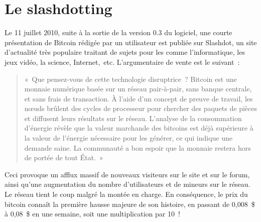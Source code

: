 \section*{Le slashdotting}

Le 11 juillet 2010, suite à la sortie de la version 0.3 du logiciel, une courte présentation de Bitcoin rédigée par un utilisateur est publiée sur Slashdot, un site d'actualité très populaire traitant de sujets pour les  comme l'informatique, les jeux vidéo, la science, Internet,~etc. L'argumentaire de vente est le suivant~:

\begin{quote}
«~Que pensez-vous de cette technologie disruptrice~? Bitcoin est une monnaie numérique basée sur un réseau pair-à-pair, sans banque centrale, et sans frais de transaction. À l'aide d'un concept de preuve de travail, les nœuds brûlent des cycles de processeur pour chercher des paquets de pièces et diffusent leurs résultats sur le réseau. L'analyse de la consommation d'énergie révèle que la valeur marchande des bitcoins est déjà supérieure à la valeur de l'énergie nécessaire pour les générer, ce qui indique une demande saine. La communauté a bon espoir que la monnaie restera hors de portée de tout État.~»
\end{quote}

Ceci provoque un afflux massif de nouveaux visiteurs sur le site et sur le forum, ainsi qu'une augmentation du nombre d'utilisateurs et de mineurs sur le réseau. Le réseau tient le coup malgré la montée en charge. En conséquence, le prix du bitcoin connaît la première hausse majeure de son histoire, en passant de 0,008~\$ à 0,08~\$ en une semaine, soit une multiplication par 10~! %

